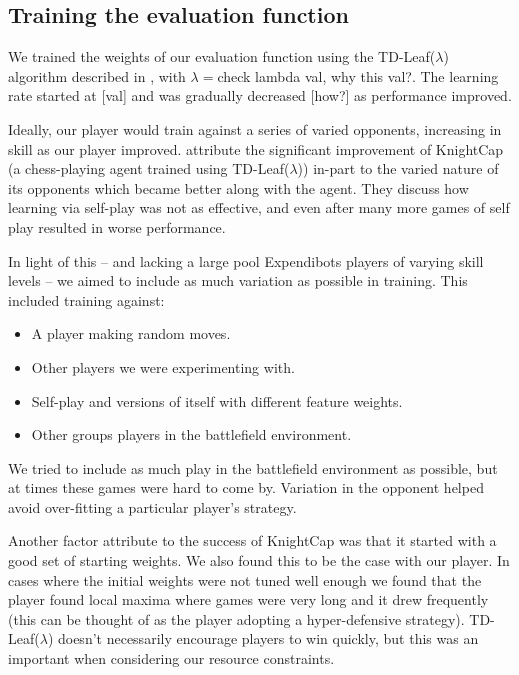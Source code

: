 \documentclass[11pt]{article}
\newcommand{\drafting}[1]{\textcolor{OliveGreen}{#1}}
\begin{document}
\subsection{Training the evaluation function}
We trained the weights of our evaluation function using the TD-Leaf($\lambda$) algorithm described in \cite{baxter_tdleaflambda_1999}, with $\lambda = $\drafting{check lambda val, why this val?}. The learning rate started at [\drafting{val}] and was gradually decreased [\drafting{how?}] as performance improved. 

Ideally, our player would train against a series of varied opponents, increasing in skill as our player improved. \cite{baxter_tdleaflambda_1999} attribute the significant improvement of KnightCap (a chess-playing agent trained using TD-Leaf($\lambda$)) in-part to the varied nature of its opponents which became better along with the agent. They discuss how learning via self-play was not as effective, and even after many more games of self play resulted in worse performance. 

In light of this -- and lacking a large pool Expendibots players of varying skill levels -- we aimed to include as much variation as possible in training. This included training against:
\begin{itemize}
    \item A player making random moves.
    \item Other players we were experimenting with.
    \item Self-play and versions of itself with different feature weights.
    \item Other groups players in the battlefield environment.
\end{itemize}
We tried to include as much play in the battlefield environment as possible, but at times these games were hard to come by. Variation in the opponent helped avoid over-fitting a particular player's strategy.

Another factor \cite{baxter_tdleaflambda_1999} attribute to the success of KnightCap was that it started with a good set of starting weights. We also found this to be the case with our player. In cases where the initial weights were not tuned well enough we found that the player found local maxima where games were very long and it drew frequently (this can be thought of as the player adopting a hyper-defensive strategy). TD-Leaf($\lambda$) doesn't necessarily encourage players to win quickly, but this was an important when considering our resource constraints.
\end{document}

